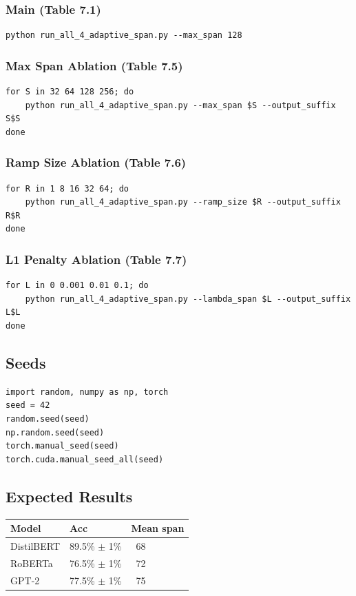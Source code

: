 \subsubsection{Main (Table 7.1)}
\begin{lstlisting}
python run_all_4_adaptive_span.py --max_span 128
\end{lstlisting}

\subsubsection{Max Span Ablation (Table 7.5)}
\begin{lstlisting}
for S in 32 64 128 256; do
    python run_all_4_adaptive_span.py --max_span $S --output_suffix S$S
done
\end{lstlisting}

\subsubsection{Ramp Size Ablation (Table 7.6)}
\begin{lstlisting}
for R in 1 8 16 32 64; do
    python run_all_4_adaptive_span.py --ramp_size $R --output_suffix R$R
done
\end{lstlisting}

\subsubsection{L1 Penalty Ablation (Table 7.7)}
\begin{lstlisting}
for L in 0 0.001 0.01 0.1; do
    python run_all_4_adaptive_span.py --lambda_span $L --output_suffix L$L
done
\end{lstlisting}

\subsection{Seeds}

\begin{lstlisting}
import random, numpy as np, torch
seed = 42
random.seed(seed)
np.random.seed(seed)
torch.manual_seed(seed)
torch.cuda.manual_seed_all(seed)
\end{lstlisting}

\subsection{Expected Results}

\begin{table}[H]
\centering
\small
\begin{tabular}{lll}
\toprule
\textbf{Model} & \textbf{Acc} & \textbf{Mean span} \\
\midrule
DistilBERT & 89.5\% $\pm$ 1\% & ~68 \\
RoBERTa & 76.5\% $\pm$ 1\% & ~72 \\
GPT-2 & 77.5\% $\pm$ 1\% & ~75 \\
\bottomrule
\end{tabular}
\end{table}

